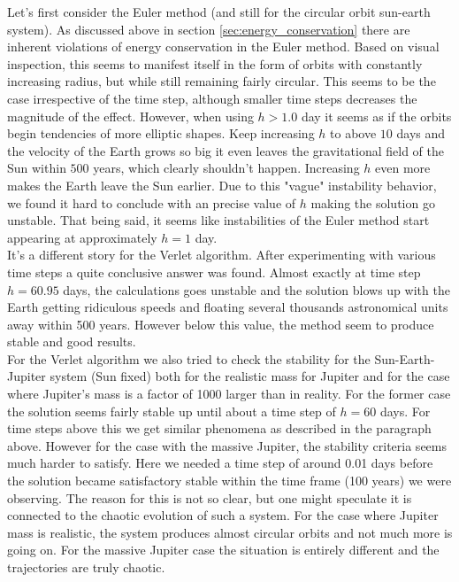 \documentclass[12pt]{article}
\numberwithin{figure}{section}
\numberwithin{table}{section}
\begin{document}
\noindent Let's first consider the Euler method (and still for the circular orbit sun-earth system). As discussed above in section \ref{sec:energy_conservation} there are inherent violations of energy conservation in the Euler method. Based on visual inspection, this seems to manifest itself in the form of orbits with constantly increasing radius, but while still remaining fairly circular. This seems to be the case irrespective of the time step, although smaller time steps decreases the magnitude of the effect. However, when using $h>1.0$ day it seems as if the orbits begin tendencies of more elliptic shapes. Keep increasing $h$ to above $10$ days and the velocity of the Earth grows so big it even leaves the gravitational field of the Sun within $500$ years, which clearly shouldn't happen. Increasing $h$ even more makes the Earth leave the Sun earlier. Due to this "vague" instability behavior, we found it hard to conclude with an precise value of $h$ making the solution go unstable. That being said, it seems like instabilities of the Euler method start appearing at approximately $h=1$ day.\\

\noindent It's a different story for the Verlet algorithm. After experimenting with various time steps a quite conclusive answer was found. Almost exactly at time step $h=60.95$ days, the calculations goes unstable and the solution blows up with the Earth getting ridiculous speeds and floating several thousands astronomical units away within 500 years. However below this value, the method seem to produce stable and good results. \\

\noindent For the Verlet algorithm we also tried to check the stability for the Sun-Earth-Jupiter system (Sun fixed) both for the realistic mass for Jupiter and for the case where Jupiter's mass is a factor of 1000 larger than in reality. For the former case the solution seems fairly stable up until about a time step of $h=60$ days. For time steps above this we get similar phenomena as described in the paragraph above. However for the case with the massive Jupiter, the stability criteria seems much harder to satisfy. Here we needed a time step of around 0.01 days before the solution became satisfactory stable within the time frame (100 years) we were observing. The reason for this is not so clear, but one might speculate it is connected to the chaotic evolution of such a system. For the case where Jupiter mass is realistic, the system produces almost circular orbits and not much more is going on. For the massive Jupiter case the situation is entirely different and the trajectories are truly chaotic.
\end{document}
